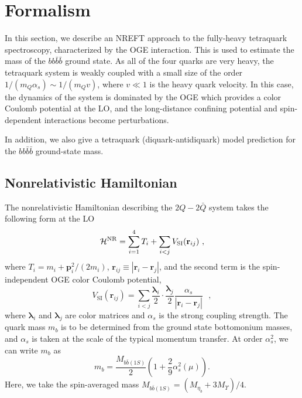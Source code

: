 \documentclass[twocolumn,showpacs,superscriptaddress,preprintnumbers,nofootinbib,prd]{revtex4-1}
\begin{document}
\section{Formalism}
\label{nrmodel}

In this section, we describe an NREFT approach to the fully-heavy tetraquark
spectroscopy, characterized by the OGE interaction. This is used to estimate the
mass of the $b b \bar b \bar b$ ground state.
As all of the four quarks are very heavy, the tetraquark system is weakly
coupled with a small size of the order $1/(m_Q\alpha_s)\sim 1/(m_Q v)$,
where $v\ll1$ is the heavy quark velocity.
In this case, the dynamics of the system is dominated by the OGE which provides
a color Coulomb potential at the LO, and the long-distance confining
potential and spin-dependent interactions become perturbations.

In addition, we also give a tetraquark (diquark-antidiquark) model
prediction for the $b b \bar b \bar b$ ground-state mass.


\subsection{Nonrelativistic Hamiltonian}

The nonrelativistic Hamiltonian describing the $2Q-2\bar{Q}$ system
takes the following form at the LO
\begin{equation}
	\label{eqn:nonrelH}
	\mathcal H^{\rm NR}=\sum_{i=1}^{4} T_i + \sum_{i<j}
	V_{\textrm{SI}}(\textbf{r}_{ij}) \mbox{ },
\end{equation}
where $T_i = m_i +{\textbf{p}_{i}^{2}}/{(2m_i)}$,
$\textbf{r}_{ij}\equiv|\textbf{r}_{i}-\textbf{r}_{j}|$,
and the second term is the spin-independent OGE color Coulomb potential,
\begin{equation}
V_{\textrm{SI}}(\textbf{r}_{ij})=\sum_{i<j} \frac{\bm\lambda_i}{2} \cdot  \frac{\bm\lambda_j}{2} \frac{\alpha_s}{|\textbf{r}_{i}-\textbf{r}_{j}|} \mbox{ },
\end{equation}
where $\bm\lambda_i$ and $\bm\lambda_j$ are color matrices and $\alpha_s$ is the strong coupling strength.
The quark mass $m_b$ is to be determined from the ground state
bottomonium masses, and $\alpha_s$ is taken at the scale of the
typical momentum transfer. At order $\alpha_{s}^{2}$, we can write $m_b$ as~\cite{Jia:2006gw}
\begin{equation}
  \label{eqn:bmass}
  m_b = \frac{M_{b\bar b(1S)}}{2}\left( 1+ \frac29 \alpha_s^2(\mu) \right).
\end{equation}
Here, we take the spin-averaged mass $M_{b\bar b(1S)}=\left(M_{\eta_{b}}+3
M_{\Upsilon} \right)/4 $.
\end{document}
